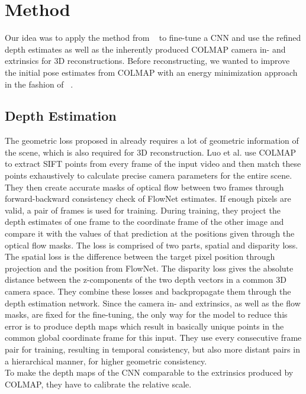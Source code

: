 \chapter{Method}
    Our idea was to apply the method from ~\cite{luo2020consistent} to fine-tune a CNN and use the refined depth estimates as well as the inherently produced COLMAP camera in- and extrinsics for 3D reconstructions.
    Before reconstructing, we wanted to improve the initial pose estimates from COLMAP with an energy minimization approach in the fashion of ~\cite{dai2017bundlefusion}.

    \section{Depth Estimation}
        The geometric loss proposed in  already requires a lot of geometric information of the scene, which is also required for 3D reconstruction.
        Luo et al. use COLMAP to extract SIFT points from every frame of the input video and then match these points exhaustively to calculate precise camera parameters for the entire scene.
        They then create accurate masks of optical flow between two frames through forward-backward consistency check of FlowNet estimates.
        If enough pixels are valid, a pair of frames is used for training.
        During training, they project the depth estimates of one frame to the coordinate frame of the other image and compare it with the values of that prediction at the positions given through the optical flow masks.
        The loss is comprised of two parts, spatial and disparity loss.
        The spatial loss is the difference between the target pixel position through projection and the position from FlowNet.
        The disparity loss gives the absolute distance between the z-components of the two depth vectors in a common 3D camera space.
        They combine these losses and backpropagate them through the depth estimation network.
        Since the camera in- and extrinsics, as well as the flow masks, are fixed for the fine-tuning, the only way for the model to reduce this error is to produce depth maps which result in basically unique points in the common global coordinate frame for this input.
        They use every consecutive frame pair for training, resulting in temporal consistency, but also more distant pairs in a hierarchical manner, for higher geometric consistency.\\
        To make the depth maps of the CNN comparable to the extrinsics produced by COLMAP, they have to calibrate the relative scale.
